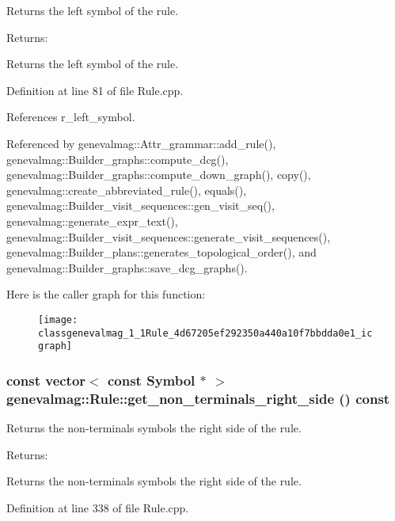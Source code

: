 Returns the left symbol of the rule. \begin{Desc}
\item[Returns:]\end{Desc}
Returns the left symbol of the rule. 

Definition at line 81 of file Rule.cpp.

References r\_\-left\_\-symbol.

Referenced by genevalmag::Attr\_\-grammar::add\_\-rule(), genevalmag::Builder\_\-graphs::compute\_\-dcg(), genevalmag::Builder\_\-graphs::compute\_\-down\_\-graph(), copy(), genevalmag::create\_\-abbreviated\_\-rule(), equals(), genevalmag::Builder\_\-visit\_\-sequences::gen\_\-visit\_\-seq(), genevalmag::generate\_\-expr\_\-text(), genevalmag::Builder\_\-visit\_\-sequences::generate\_\-visit\_\-sequences(), genevalmag::Builder\_\-plans::generates\_\-topological\_\-order(), and genevalmag::Builder\_\-graphs::save\_\-dcg\_\-graphs().

Here is the caller graph for this function:\nopagebreak
\begin{figure}[H]
\begin{center}
\leavevmode
\texttt{[image: classgenevalmag\_1\_1Rule\_4d67205ef292350a440a10f7bbdda0e1\_icgraph]}
\end{center}
\end{figure}
\hypertarget{classgenevalmag_1_1Rule_639ed428a76f9c389bad3fc7730aaef6}{
\subsubsection[{get\_\-non\_\-terminals\_\-right\_\-side}]{\setlength{\rightskip}{0pt plus 5cm}const vector$<$ const {\bf Symbol} $\ast$ $>$ genevalmag::Rule::get\_\-non\_\-terminals\_\-right\_\-side () const}}
\label{classgenevalmag_1_1Rule_639ed428a76f9c389bad3fc7730aaef6}


Returns the non-terminals symbols the right side of the rule. \begin{Desc}
\item[Returns:]\end{Desc}
Returns the non-terminals symbols the right side of the rule. 

Definition at line 338 of file Rule.cpp.

